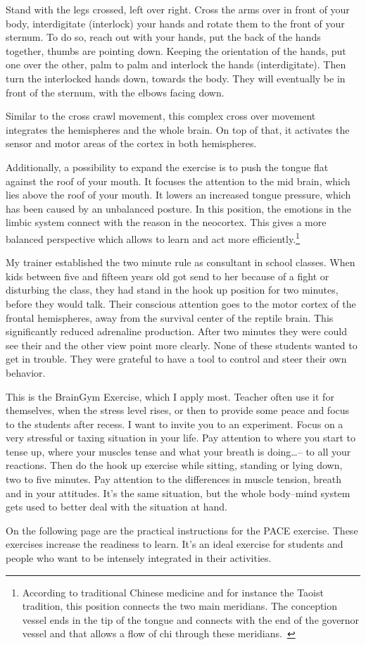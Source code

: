 \documentclass[../main.tex]{subfiles}
\begin{document}
  Stand with the {legs crossed}, left over right.
  {Cross the arms} over in front of your body, interdigitate (interlock) your hands and rotate them {to the front of your sternum}.
  To do so, reach out with your hands, put the {back of the hands together}, thumbs are pointing down.
  Keeping the orientation of the hands, put one over the other, palm to palm and {interlock the hands} (interdigitate).
  Then {turn} the interlocked {hands down, towards the body}. They will eventually be {in front of the sternum}, with the elbows facing down. 

  Similar to the cross crawl movement, this complex cross over movement {integrates the hemispheres} and the whole brain.
  On top of that, it activates the {sensor and motor areas} of the cortex in both hemispheres.
  
  Additionally, a possibility to expand the exercise is to push the tongue flat against the roof of your mouth.
  It focuses the attention to the {mid brain}, which lies above the roof of your mouth.
  It lowers an {increased tongue pressure}, which has been   caused by an unbalanced posture.
  In this position,  the emotions in the limbic system connect with the reason in the neocortex.
  This gives a more balanced perspective which allows to learn and act more efficiently.\footnote{According
    to traditional Chinese medicine and for instance the Taoist tradition, this position connects the {two main meridians}.
  The conception vessel ends in the tip of the tongue and connects with the end of the governor vessel and that allows a flow of chi through these meridians.~\cite{ChiaMCO}}
 
My trainer established the two minute rule as consultant in school classes.
When kids between five and fifteen years old got send to her because of a fight or disturbing the class, they had stand in the hook up position for two minutes, before they would talk.
Their conscious attention goes to the motor cortex of the frontal hemispheres, away from the survival center of the reptile brain. This significantly reduced adrenaline production.
After two minutes they were could see their and the other view point more clearly.
None of these students wanted to get in trouble. They were grateful to have a tool to control and steer their own behavior.

This is the BrainGym Exercise, which I apply most. Teacher often use it for themselves, when the stress level rises, or then to provide some peace and focus to the students after recess.
I want to invite you to an experiment.
Focus on a very stressful or taxing situation in your life.
Pay attention to where you start to tense up, where your muscles tense and what your breath is doing\ldots -- to all your reactions.
Then do the hook up exercise while sitting, standing or lying down, two to five minutes.
Pay attention to the differences in muscle tension, breath and in your attitudes.
It's the same situation, but the whole body--mind system gets used to better deal with the situation at hand.

On the following page are the practical instructions for the PACE exercise. These exercises increase the readiness to learn.
It's an ideal exercise for students and people who want to be intensely integrated in their activities.
\newpage
\end{document}

